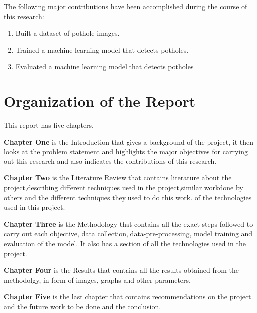 \documentclass[12pt]{report}
\begin{document}
The following major contributions have been accomplished during the course of this research:

\begin{enumerate}[topsep=0pt]

\item Built a dataset of pothole images.

\item Trained a machine learning model that detects potholes.

\item Evaluated a machine learning model that detects potholes


\end{enumerate}






\section{Organization of the Report}

This report has five chapters,

\textbf {Chapter One} is the Introduction that gives a background of the project, it then looks at the problem statement and highlights the major objectives for carrying out this research and also indicates the contributions of this research.

\textbf {Chapter Two} is the Literature Review that contains literature about the project,describing different techniques used in the project,similar workdone by others and the different techniques they used to do this work.
  of the technologies used in this project.

\textbf {Chapter Three} is the Methodology that contains all the exact steps followed to carry out each objective, data collection, data-pre-processing, model training and evaluation of the model. It also has a section of all the technologies used in the project.

\textbf{Chapter Four} is the Results that contains all the results obtained from the methodolgy, in form of images, graphs and other parameters.

\textbf{Chapter Five} is the last chapter that contains recommendations on the project and the future work to be done and the conclusion.
 

\end{document}
